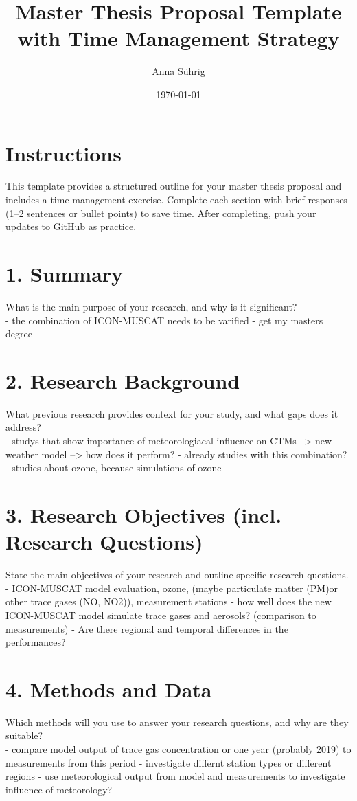 \documentclass[a4paper,12pt]{article}
\title{Master Thesis Proposal Template with Time Management Strategy}
\author{Anna Sührig}
\date{\today}
\begin{document}
\maketitle

\section*{Instructions}
This template provides a structured outline for your master thesis proposal and includes a time management exercise. Complete each section with brief responses (1–2 sentences or bullet points) to save time. After completing, push your updates to GitHub as practice.

\section{1. Summary}
What is the main purpose of your research, and why is it significant?\\
- the combination of ICON-MUSCAT needs to be varified 
- get my masters degree

\section{2. Research Background}
What previous research provides context for your study, and what gaps does it address?\\
- studys that show importance of meteorologiacal influence on CTMs --> new weather model --> how does it perform?
- already studies with this combination?
- studies about ozone, because simulations of ozone 

\section{3. Research Objectives (incl. Research Questions)}
State the main objectives of your research and outline specific research questions.
- ICON-MUSCAT model evaluation, ozone, (maybe particulate matter (PM)or other trace gases (NO, NO2)), measurement stations
- how well does the new ICON-MUSCAT model simulate trace gases and aerosols? (comparison to measurements) 
- Are there regional and temporal differences in the performances?

\section{4. Methods and Data}
Which methods will you use to answer your research questions, and why are they suitable?\\
- compare model output of trace gas concentration or one year (probably 2019) to measurements from this period 
- investigate differnt station types or different regions
- use meteorological output from model and measurements to investigate influence of meteorology?
\end{document}

